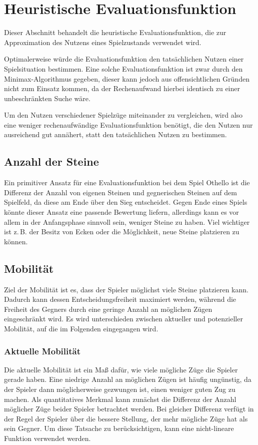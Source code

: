 \section{Heuristische Evaluationsfunktion}
\label{sec:heuristic}
Dieser Abschnitt behandelt die heuristische Evaluationsfunktion, die zur Approximation des Nutzens eines Spielzustands
verwendet wird.

Optimalerweise würde die Evaluationsfunktion den tatsächlichen Nutzen einer Spielsituation bestimmen. Eine solche
Evaluationsfunktion ist zwar durch den Minimax-Algorithmus gegeben, dieser kann jedoch aus offensichtlichen Gründen
nicht zum Einsatz kommen, da der Rechenaufwand hierbei identisch zu einer unbeschränkten Suche wäre.

Um den Nutzen verschiedener Spielzüge miteinander zu vergleichen, wird also eine weniger rechenaufwändige
Evaluationsfunktion benötigt, die den Nutzen nur ausreichend gut annähert, statt den tatsächlichen Nutzen zu bestimmen.

\subsection{Anzahl der Steine}
\label{sec:disccount}
Ein primitiver Ansatz für eine Evaluationsfunktion bei dem Spiel Othello ist die Differenz der Anzahl von eigenen
Steinen und gegnerischen Steinen auf dem Spielfeld, da diese am Ende über den Sieg entscheidet. Gegen Ende eines Spiels
könnte dieser Ansatz eine passende Bewertung liefern, allerdings kann es vor allem in der Anfangsphase sinnvoll sein,
weniger Steine zu haben. Viel wichtiger ist z.\,B. der Besitz von Ecken oder die Möglichkeit, neue Steine platzieren zu
können.

\subsection{Mobilität}
\label{sec:mobility}
Ziel der Mobilität ist es, dass der Spieler möglichst viele Steine platzieren kann. Dadurch kann dessen
Entscheidungsfreiheit maximiert werden, während die Freiheit des Gegners durch eine geringe Anzahl an möglichen Zügen
eingeschränkt wird. Es wird unterschieden zwischen aktueller und potenzieller Mobilität, auf die im Folgenden
eingegangen wird.
\cite[S.~7f.]{evaluationfunctions}

\subsubsection{Aktuelle Mobilität}
\label{sec:theorycurrentmobility}
Die aktuelle Mobilität ist ein Maß dafür, wie viele mögliche Züge die Spieler gerade haben. Eine niedrige Anzahl an
möglichen Zügen ist häufig ungünstig, da der Spieler dann möglicherweise gezwungen ist, einen weniger guten Zug zu
machen. Als quantitatives Merkmal kann zunächst die Differenz der Anzahl möglicher Züge beider Spieler betrachtet
werden. Bei gleicher Differenz verfügt in der Regel der Spieler über die bessere Stellung, der mehr mögliche Züge hat
als sein Gegner. Um diese Tatsache zu berücksichtigen, kann eine nicht-lineare Funktion verwendet werden.
\cite[S.~7]{evaluationfunctions}

